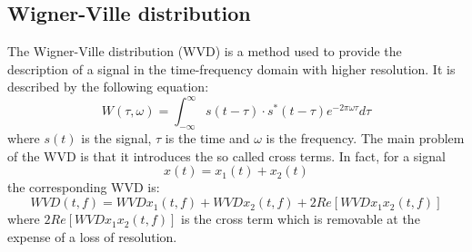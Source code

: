 \documentclass[a4paper]{sapthesis}
\begin{document}
\subsection{Wigner-Ville distribution}\label{sec:wvd}
The Wigner-Ville distribution (WVD)\cite{wvd} is a method used to provide
the description of a signal in the time-frequency domain with higher resolution.
It is described by the following equation:
\begin{equation}
\label{eq:wvd}
W(\tau, \omega) = \int_{-\infty}^{\infty} s(t-\tau) \cdot s^*(t-\tau) e^{-2\pi\omega \tau} d\tau
\end{equation}
where $s(t)$ is the signal, $\tau$ is the time and $\omega$ is the frequency.
The main problem of the WVD is that it introduces the so called cross terms.
In fact, for a signal
\begin{equation} x(t)=x_1(t)+x_2(t)
\end{equation}
the corresponding WVD is:
\begin{equation}
WVD(t,f)= WVDx_1(t,f) + WVDx_2(t,f) + 2Re[WVDx_1x_2(t,f)]
\end{equation}
where $2Re[WVDx_1x_2(t,f)]$ is the cross term
which is removable at the expense of a loss of resolution.  \newline
\end{document}
